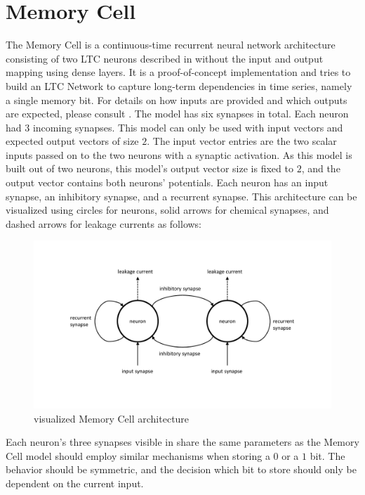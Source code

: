 \documentclass[draft,final]{vutinfth} %
\begin{document}
    \section{Memory Cell} \label{memory_cell}
    The Memory Cell is a continuous-time recurrent neural network architecture consisting of two LTC neurons described in  without the input and output mapping using dense layers.
    It is a proof-of-concept implementation and tries to build an LTC Network \cite{LTCNetworks} to capture long-term dependencies in time series, namely a single memory bit.
    For details on how inputs are provided and which outputs are expected, please consult .
    The model has six synapses in total. Each neuron had $3$ incoming synapses.
    This model can only be used with input vectors and expected output vectors of size $2$.
    The input vector entries are the two scalar inputs passed on to the two neurons with a synaptic activation.
    As this model is built out of two neurons, this model's output vector size is fixed to $2$, and the output vector contains both neurons' potentials.
    Each neuron has an input synapse, an inhibitory synapse, and a recurrent synapse.
    This architecture can be visualized using circles for neurons, solid arrows for chemical synapses, and dashed arrows for leakage currents as follows:
    \begin{figure}[H]
        \centering{}
        \includegraphics[width=\linewidth]{graphics/memory_cell.pdf}
        \caption{visualized Memory Cell architecture}
        \label{fig:memory_cell_vis}
    \end{figure}
    Each neuron's three synapses visible in  share the same parameters as the Memory Cell model should employ similar mechanisms when storing a $0$ or a $1$ bit.
    The behavior should be symmetric, and the decision which bit to store should only be dependent on the current input.
\end{document}
